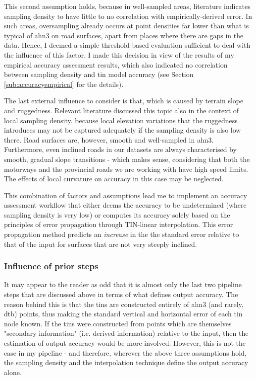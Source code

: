 This second assumption holds, because in well-sampled areas, literature indicates sampling density to have little to no correlation with empirically-derived error. In such areas, oversampling already occurs at point densities far lower than what is typical of \ac{ahn3} on road surfaces, apart from places where there are gaps in the data. Hence, I deemed a simple threshold-based evaluation sufficient to deal with the influence of this factor. I made this decision in view of the results of my empirical accuracy assessment results, which also indicated no correlation between sampling density and \ac{tin} model accuracy (see Section \ref{sub:accuracyempirical} for the details).

The last external influence to consider is that, which is caused by terrain slope and ruggedness. Relevant literature discussed this topic also in the context of local sampling density. because local elevation variations that the ruggedness introduces may not be captured adequately if the sampling density is also low there. Road surfaces are, however, smooth and well-sampled in \ac{ahn3}. Furthermore, even inclined roads in our datasets are always characterised by smooth, gradual slope transitions - which makes sense, considering that both the motorways and the provincial roads we are working with have high speed limits. The effects of local curvature on accuracy in this case may be neglected.

This combination of factors and assumptions lead me to implement an accuracy assessment workflow that either deems the accuracy to be undetermined (where sampling density is very low) or computes its accuracy solely based on the principles of error propagation through TIN-linear interpolation. This error propagation method predicts an \textit{increase} in the the standard error relative to that of the input for surfaces that are not very steeply inclined.

\subsubsection{Influence of prior steps}

It may appear to the reader as odd that it is almost only the last two pipeline steps that are discussed above in terms of what defines output accuracy. The reason behind this is that the \ac{tin}s are constructed entirely of \ac{ahn3} (and rarely, \ac{dtb}) points, thus making the standard vertical and horizontal error of each \ac{tin} node known. If the \ac{tin}s were constructed from points which are themselves "secondary information" (i.e. derived information) relative to the input, then the estimation of output accuracy would be more involved. However, this is not the case in my pipeline - and therefore, wherever the above three assumptions hold, the sampling density and the interpolation technique define the output accuracy alone.

